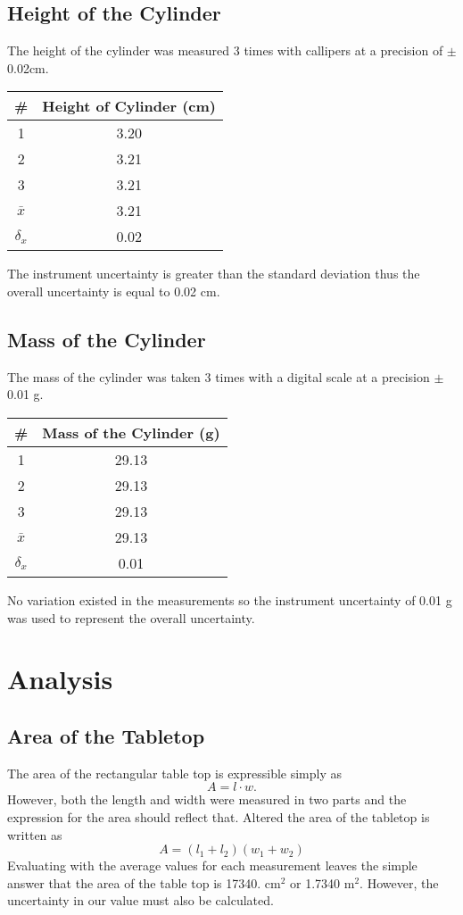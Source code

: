 \documentclass[11pt]{article}
\begin{document}
\subsection{Height of the Cylinder}
The height of the cylinder was measured 3 times with callipers at a precision of \( \pm \)0.02cm.
\begin{center}
	\begin{tabular}{|c|c|}
		\hline
		\# & Height of Cylinder (cm) \\
		\hline
		1 & 3.20 \\
		2 & 3.21 \\
		3 & 3.21 \\
		\hline
		\(\bar{x}\) & 3.21 \\
		\hline
		\( \delta_x \) & 0.02 \\
		\hline
	\end{tabular}
\end{center}
The instrument uncertainty is greater than the standard deviation thus the overall uncertainty is equal to 0.02 cm.
\subsection{Mass of the Cylinder}
The mass of the cylinder was taken 3 times with a digital scale at a precision \(\pm\)0.01 g.
\begin{center}
	\begin{tabular}{|c|c|}
		\hline
		\# & Mass of the Cylinder (g) \\
		\hline
		1 & 29.13 \\
		2 & 29.13 \\
		3 & 29.13 \\
		\hline
		\(\bar{x}\) & 29.13 \\
		\hline
		\( \delta_x \) & 0.01 \\
		\hline
	\end{tabular}
\end{center}
No variation existed in the measurements so the instrument uncertainty of 0.01 g was used to represent the overall uncertainty.
\section{Analysis}
\subsection{Area of the Tabletop}
The area of the rectangular table top is expressible simply as 
\begin{equation}
A = l \cdot w.
\end{equation}
However, both the length and width were measured in two parts and the expression for the area should reflect that. Altered the area of the tabletop is written as
\begin{equation} \label{eq:area}
	A = \left(l_1 + l_2 \right) \left(w_1 + w_2 \right) 
\end{equation}
Evaluating with the average values for each measurement leaves the simple answer that the area of the table top is 17340. \(\mathrm{cm}^2\) or 1.7340 \(\mathrm{m}^2\). However, the uncertainty in our value must also be calculated.
\end{document}
